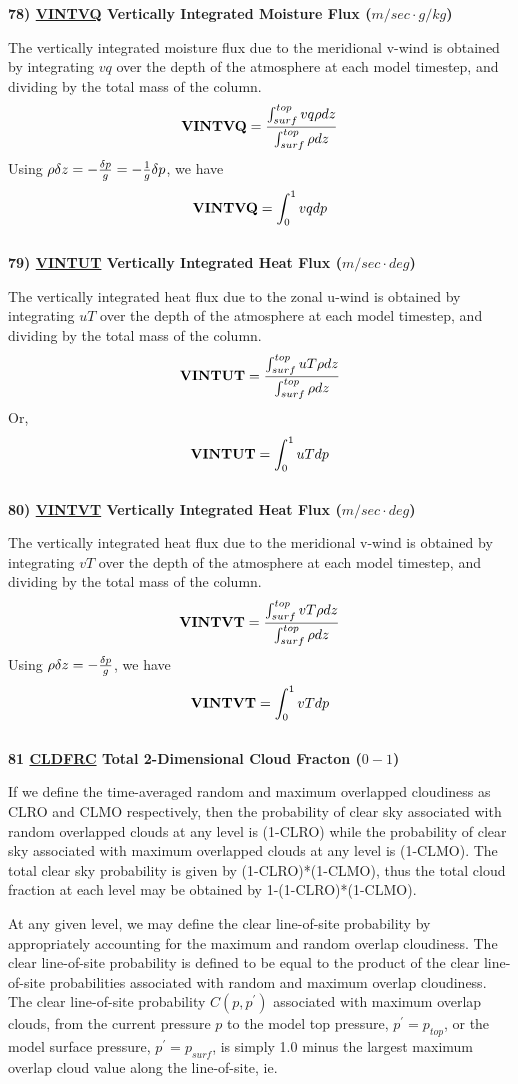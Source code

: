\noindent
{\bf 78)  \underline {VINTVQ} Vertically Integrated Moisture Flux ($m/sec \cdot g/kg$) }

\noindent
The vertically integrated moisture flux due to the meridional v-wind is obtained by integrating
$v q$ over the depth of the atmosphere at each model timestep, 
and dividing by the total mass of the column.
\[
{\bf VINTVQ} = \frac{ \int_{surf}^{top} v q \rho dz  } { \int_{surf}^{top} \rho dz  }
\]
Using $\rho \delta z = -{\delta p \over g} = - {1 \over g} \delta p$, we have 
\[
{\bf VINTVQ} = { \int_0^1 v q dp  }
\]
\\


\noindent
{\bf 79)  \underline {VINTUT} Vertically Integrated Heat Flux ($m/sec \cdot deg$) }

\noindent
The vertically integrated heat flux due to the zonal u-wind is obtained by integrating
$u T$ over the depth of the atmosphere at each model timestep, 
and dividing by the total mass of the column.
\[
{\bf VINTUT} = \frac{ \int_{surf}^{top} u T \rho dz  } { \int_{surf}^{top} \rho dz  }
\]
Or,
\[
{\bf VINTUT} = { \int_0^1 u T dp  }
\]
\\

\noindent
{\bf 80)  \underline {VINTVT} Vertically Integrated Heat Flux ($m/sec \cdot deg$) }

\noindent
The vertically integrated heat flux due to the meridional v-wind is obtained by integrating
$v T$ over the depth of the atmosphere at each model timestep, 
and dividing by the total mass of the column.
\[
{\bf VINTVT} = \frac{ \int_{surf}^{top} v T \rho dz  } { \int_{surf}^{top} \rho dz  }
\]
Using $\rho \delta z = -{\delta p \over g} $, we have 
\[
{\bf VINTVT} = { \int_0^1 v T dp  }
\]
\\

\noindent
{\bf 81 \underline {CLDFRC} Total 2-Dimensional Cloud Fracton ($0-1$) }

If we define the
time-averaged random and maximum overlapped cloudiness as CLRO and
CLMO respectively, then the probability of clear sky associated 
with random overlapped clouds at any level is (1-CLRO) while the probability of
clear sky associated with maximum overlapped clouds at any level is (1-CLMO). 
The total clear sky probability is given by (1-CLRO)*(1-CLMO), thus
the total cloud fraction at each  level may be obtained by 
1-(1-CLRO)*(1-CLMO).

At any given level, we may define the clear line-of-site probability by
appropriately accounting for the maximum and random overlap
cloudiness.  The clear line-of-site probability is defined to be
equal to the product of the clear line-of-site probabilities
associated with random and maximum overlap cloudiness.  The clear
line-of-site probability $C(p,p^{\prime})$ associated with maximum overlap clouds, 
from the current pressure $p$ 
to the model top pressure, $p^{\prime} = p_{top}$, or the model surface pressure, $p^{\prime} = p_{surf}$,
is simply 1.0 minus the largest maximum overlap cloud value along  the
line-of-site, ie.

